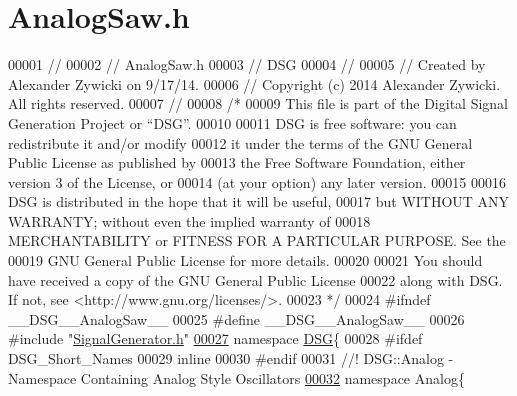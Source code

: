 \hypertarget{_analog_saw_8h_source}{\section{Analog\+Saw.\+h}
\label{_analog_saw_8h_source}
}

\begin{DoxyCode}
00001 \textcolor{comment}{//}
00002 \textcolor{comment}{//  AnalogSaw.h}
00003 \textcolor{comment}{//  DSG}
00004 \textcolor{comment}{//}
00005 \textcolor{comment}{//  Created by Alexander Zywicki on 9/17/14.}
00006 \textcolor{comment}{//  Copyright (c) 2014 Alexander Zywicki. All rights reserved.}
00007 \textcolor{comment}{//}
00008 \textcolor{comment}{/*}
00009 \textcolor{comment}{ This file is part of the Digital Signal Generation Project or “DSG”.}
00010 \textcolor{comment}{}
00011 \textcolor{comment}{ DSG is free software: you can redistribute it and/or modify}
00012 \textcolor{comment}{ it under the terms of the GNU General Public License as published by}
00013 \textcolor{comment}{ the Free Software Foundation, either version 3 of the License, or}
00014 \textcolor{comment}{ (at your option) any later version.}
00015 \textcolor{comment}{}
00016 \textcolor{comment}{ DSG is distributed in the hope that it will be useful,}
00017 \textcolor{comment}{ but WITHOUT ANY WARRANTY; without even the implied warranty of}
00018 \textcolor{comment}{ MERCHANTABILITY or FITNESS FOR A PARTICULAR PURPOSE.  See the}
00019 \textcolor{comment}{ GNU General Public License for more details.}
00020 \textcolor{comment}{}
00021 \textcolor{comment}{ You should have received a copy of the GNU General Public License}
00022 \textcolor{comment}{ along with DSG.  If not, see <http://www.gnu.org/licenses/>.}
00023 \textcolor{comment}{ */}
00024 \textcolor{preprocessor}{#ifndef \_\_DSG\_\_AnalogSaw\_\_}
00025 \textcolor{preprocessor}{#define \_\_DSG\_\_AnalogSaw\_\_}
00026 \textcolor{preprocessor}{#include "\hyperlink{_signal_generator_8h}{SignalGenerator.h}"}
\hypertarget{_analog_saw_8h_source_l00027}{}\hyperlink{namespace_d_s_g}{00027} \textcolor{keyword}{namespace }\hyperlink{namespace_d_s_g}{DSG}\{
00028 \textcolor{preprocessor}{#ifdef DSG\_Short\_Names}
00029     \textcolor{keyword}{inline}
00030 \textcolor{preprocessor}{#endif}
00031 \textcolor{comment}{    //! DSG::Analog - Namespace Containing Analog Style Oscillators}
\hypertarget{_analog_saw_8h_source_l00032}{}\hyperlink{namespace_d_s_g_1_1_analog}{00032} \textcolor{comment}{}    \textcolor{keyword}{namespace }Analog\{\textcolor{comment}{}

\end{DoxyCode}
